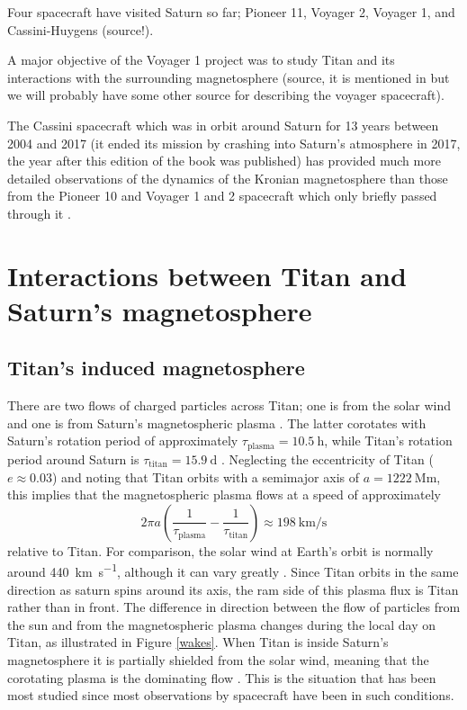 \documentclass[12pt, parskip=full*, abstract]{scrartcl}
\begin{document}
Four spacecraft have visited Saturn so far; Pioneer 11, Voyager 2, Voyager 1, and Cassini-Huygens (source!). 

A major objective of the Voyager 1 project was to study Titan and its interactions with the surrounding magnetosphere (source, it is mentioned in \parencite{hartle-1982} but we will probably have some other source for describing the voyager spacecraft). 

The Cassini spacecraft which was in orbit around Saturn for 13 years between 2004 and 2017 \parencite{cassini-2019} (it ended its mission by crashing into Saturn's atmosphere in 2017, the year after this edition of the book was published) has provided much more detailed observations of the dynamics of the Kronian magnetosphere than those from the Pioneer 10 and Voyager 1 and 2 spacecraft which only briefly passed through it \parencite{encyclopedia-magnetospheres}. 


\section{Interactions between Titan and Saturn's magnetosphere}

\subsection{Titan's induced magnetosphere}\label{s:induced-magnetosphere}
There are two flows of charged particles across Titan; one is from the solar wind and one is from Saturn's magnetospheric plasma \parencite{ionosphere-magnetosphere-interaction-coates}. The latter corotates with Saturn's rotation period of approximately $\tau_\text{plasma}=\SI{10.5}{\hour}$, while Titan's rotation period around Saturn is $\tau_\text{titan}=\SI{15.9}{\day}$ \parencite{fundamental-planetary-science}. Neglecting the eccentricity of Titan ($e\approx0.03$) and noting that Titan orbits with a semimajor axis of $a=\SI{1222}{\mega\metre}$, this implies that the magnetospheric plasma flows at a speed of approximately
\begin{equation}
	2\pi a\left(\frac{1}{\tau_\text{plasma}} - \frac{1}{\tau_\text{titan}}\right)\approx\SI{198}{\kilo\metre\per\second}
\end{equation}
relative to Titan. For comparison, the solar wind at Earth's orbit is normally around \SI{440}{\kilo\metre\per\second}, although it can vary greatly \parencite{encyclopedia-solar-wind}. Since Titan orbits in the same direction as saturn spins around its axis, the ram side of this plasma flux is  Titan rather than in front. The difference in direction between the flow of particles from the sun and from the magnetospheric plasma changes during the local day on Titan, as illustrated in Figure \ref{wakes}. When Titan is inside Saturn's magnetosphere it is partially shielded from the solar wind, meaning that the corotating plasma is the dominating flow \parencite{ionosphere-magnetosphere-interaction-coates}. This is the situation that has been most studied since most observations by spacecraft have been in such conditions.
\end{document}
